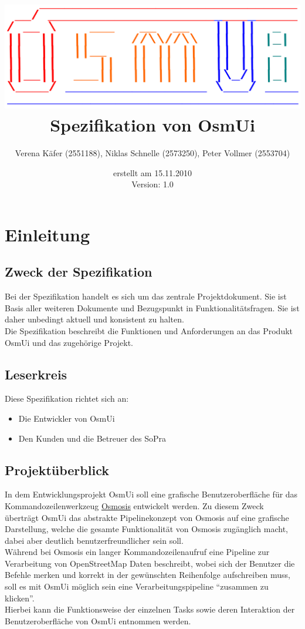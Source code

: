 \documentclass[a4paper,12pt]{scrartcl}
\author{Verena Käfer (2551188), Niklas Schnelle (2573250), Peter Vollmer (2553704)}
\date{erstellt am 15.11.2010\\
Version: 1.0}
\title{\includegraphics[width=15cm]{../projektplan/Logo_Osmui.png} \\ 
Spezifikation von OsmUi}
\begin{document}
\maketitle
\newpage
\tableofcontents
\newpage

\section{Einleitung}
\subsection{Zweck der Spezifikation}
Bei der Spezifikation handelt es sich um das zentrale Projektdokument. Sie ist Basis aller weiteren Dokumente und
Bezugspunkt in Funktionalitätsfragen. Sie ist daher unbedingt aktuell und konsistent zu halten.\\
Die Spezifikation beschreibt die Funktionen und Anforderungen an das Produkt OsmUi und das zugehörige Projekt.
\subsection{Leserkreis}
Diese Spezifikation richtet sich an:
\begin{itemize}
 \item Die Entwickler von OsmUi
 \item Den Kunden und die Betreuer des SoPra
\end{itemize}

\subsection{Projektüberblick}
In dem Entwicklungsprojekt OsmUi soll eine grafische Benutzeroberfläche für das Kommandozeilenwerkzeug \href{http://wiki.openstreetmap.org/wiki/Osmosis}{Osmosis}
entwickelt werden. Zu diesem Zweck überträgt OsmUi das abstrakte Pipelinekonzept von Osmosis auf eine grafische Darstellung, welche die gesamte Funktionalität von Osmosis zugänglich macht, dabei aber deutlich benutzerfreundlicher sein soll.\\
Während bei Osmosis ein langer Kommandozeilenaufruf eine Pipeline zur Verarbeitung von OpenStreetMap Daten beschreibt, wobei sich der Benutzer die Befehle merken
und korrekt in der gewünschten Reihenfolge aufschreiben muss, soll es mit OsmUi möglich sein eine Verarbeitungspipeline ``zusammen zu klicken''.\\
Hierbei kann die Funktionsweise der einzelnen Tasks sowie deren Interaktion der Benutzeroberfläche von OsmUi entnommen werden.
\end{document}
